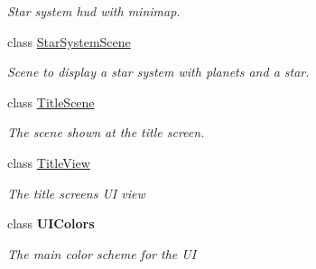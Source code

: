 \begin{DoxyCompactItemize}
\begin{DoxyCompactList}\small\item\em Star system hud with minimap. \end{DoxyCompactList}\item 
class \hyperlink{class_midnight_blue_1_1_star_system_scene}{Star\+System\+Scene}
\begin{DoxyCompactList}\small\item\em Scene to display a star system with planets and a star. \end{DoxyCompactList}\item 
class \hyperlink{class_midnight_blue_1_1_title_scene}{Title\+Scene}
\begin{DoxyCompactList}\small\item\em The scene shown at the title screen. \end{DoxyCompactList}\item 
class \hyperlink{class_midnight_blue_1_1_title_view}{Title\+View}
\begin{DoxyCompactList}\small\item\em The title screens UI view \end{DoxyCompactList}\item 
class {\bfseries U\+I\+Colors}
\begin{DoxyCompactList}\small\item\em The main color scheme for the UI \end{DoxyCompactList}\end{DoxyCompactItemize}

